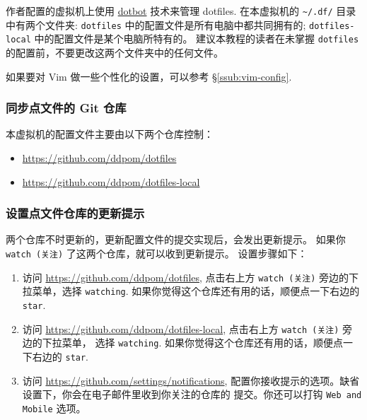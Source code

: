 \documentclass[
    11pt,
    cite=authoryear,
    device=normal,
    lang=cn,
    mode=simple,
    result=answer,
    toc=onecol,
]{elegantbook_sierxue}
\begin{document}
作者配置的虚拟机上使用
\href{https://github.com/anishathalye/dotbot}{dotbot} 技术来管理 dotfiles.
在本虚拟机的 \lstinline{~/.df/} 目录中有两个文件夹: \lstinline{dotfiles}
中的配置文件是所有电脑中都共同拥有的; \lstinline{dotfiles-local}
中的配置文件是某个电脑所特有的。
建议本教程的读者在未掌握 \lstinline{dotfiles}
的配置前，不要更改这两个文件夹中的任何文件。
\begin{tip}\label{note:vim-customized}
    如果要对 Vim 做一些个性化的设置，可以参考 \S\ref{ssub:vim-config}.
\end{tip}


\subsubsection{同步点文件的 Git 仓库}%
\label{ssub:vbox-guest-ganx-conf}

本虚拟机的配置文件主要由以下两个仓库控制：
\begin{itemize}
    \item \href{https://github.com/ddpom/dotfiles}
        {https://github.com/ddpom/dotfiles}
    \item \href{https://github.com/ddpom/dotfiles-local}
        {https://github.com/ddpom/dotfiles-local}
\end{itemize}

\subsubsection{设置点文件仓库的更新提示}%
\label{ssub:vbox-guest-ganx-conf-update-notification}

两个仓库不时更新的，更新配置文件的提交实现后，会发出更新提示。
如果你 \lstinline{watch (关注)} 了这两个仓库，就可以收到更新提示。
设置步骤如下：
\begin{enumerate}
    \item 访问 \href{https://github.com/ddpom/dotfiles}
        {https://github.com/ddpom/dotfiles}, 点击右上方
        \lstinline{watch (关注)} 旁边的下拉菜单，选择 \lstinline{watching}.
        如果你觉得这个仓库还有用的话，顺便点一下右边的 \lstinline{star}.
    \item 访问 \href{https://github.com/ddpom/dotfiles-local}
        {https://github.com/ddpom/dotfiles-local},
        点击右上方 \lstinline{watch (关注)} 旁边的下拉菜单，
        选择 \lstinline{watching}.
        如果你觉得这个仓库还有用的话，顺便点一下右边的 \lstinline{star}.
    \item 访问 \href{https://github.com/settings/notifications}
        {https://github.com/settings/notifications},
        配置你接收提示的选项。缺省设置下，你会在电子邮件里收到你关注的仓库的
        提交。你还可以打钩 \lstinline{Web and Mobile} 选项。
\end{enumerate}
\end{document}
